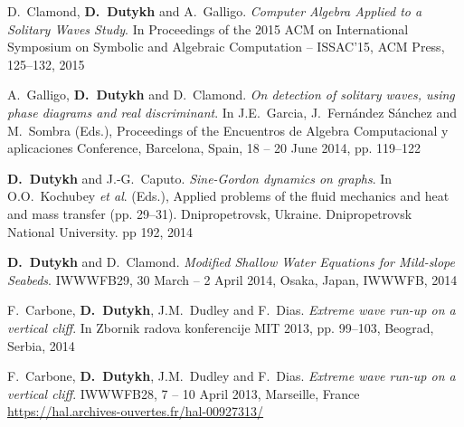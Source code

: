 \begin{etaremune}
  \item D.~Clamond, \textbf{D.~Dutykh} and A.~Galligo. \textit{Computer Algebra Applied to a Solitary Waves Study}. In Proceedings of the 2015 ACM on International Symposium on Symbolic and Algebraic Computation -- ISSAC'15, ACM Press, 125--132, 2015 %
  

  
  \item A.~Galligo, \textbf{D.~Dutykh} and D.~Clamond. \textit{On detection of solitary waves, using phase diagrams and real discriminant}. In J.E.~Garcia, J.~Fern\'andez S\'anchez and M.~Sombra (Eds.), Proceedings of the Encuentros de Algebra Computacional y aplicaciones Conference, Barcelona, Spain, 18 -- 20 June 2014, pp. 119--122 %
  
  \item \textbf{D.~Dutykh} and J.-G.~Caputo. \textit{Sine-Gordon dynamics on graphs}. In O.O.~Kochubey \emph{et al}. (Eds.), Applied problems of the fluid mechanics and heat and mass transfer (pp. 29--31). Dnipropetrovsk, Ukraine. Dnipropetrovsk National University. pp 192, 2014 %
  
  \item \textbf{D.~Dutykh} and D.~Clamond. \textit{Modified Shallow Water Equations for Mild-slope Seabeds}. IWWWFB29, 30 March -- 2 April 2014, Osaka, Japan, IWWWFB, 2014 %
  
  \item F.~Carbone, \textbf{D.~Dutykh}, J.M.~Dudley and F.~Dias. \textit{Extreme wave run-up on a vertical cliff}. In Zbornik radova konferencije MIT 2013, pp. 99--103, Beograd, Serbia, 2014 %
  

  
  \item F.~Carbone, \textbf{D.~Dutykh}, J.M.~Dudley and F.~Dias. \textit{Extreme wave run-up on a vertical cliff}. IWWWFB28, 7 -- 10 April 2013, Marseille, France \\ %
  \url{https://hal.archives-ouvertes.fr/hal-00927313/}
  

  

\end{etaremune}
